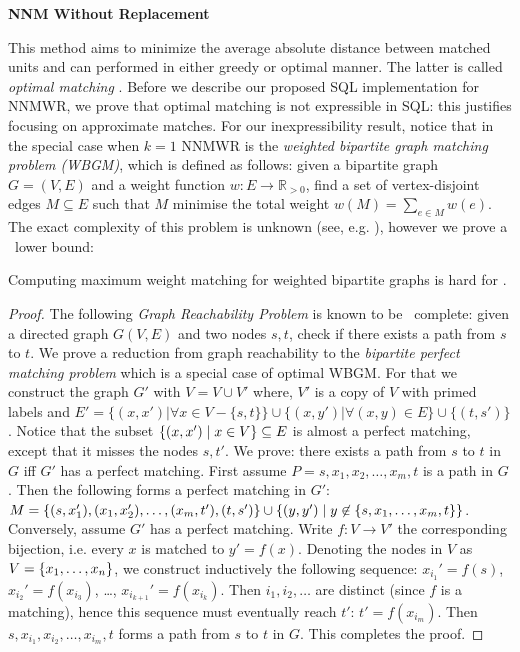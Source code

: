 {{\bf NNM Without Replacement}  This method aims
to minimize the average absolute distance between matched units and can performed in either greedy or optimal manner. The latter is called {\em optimal matching}
\cite{Rosenbaum93}. Before we describe our proposed SQL implementation for NNMWR, we prove
that optimal matching is not expressible in SQL: this justifies
focusing on approximate matches.  For our inexpressibility result,
notice that in the special case when $k=1$ NNMWR is the {\em weighted
  bipartite graph matching problem (WBGM)}, which is defined as
follows: given a bipartite graph $G=(V,E)$ and a weight function
$w: E \rightarrow \mathbb{R}_{>0}$, find a set of vertex-disjoint
edges $M \subseteq E$ such that $M$ minimise the total weight
$w(M) = \sum_{e \in M} w(e)$.  The exact complexity of this problem
is unknown (see, e.g. \cite{Avis83}), however we prove a \NLOGSPACE\
lower bound:

\vspace{-.2cm}
\begin{proposition} \label{pro:om}
Computing  maximum weight matching for  weighted bipartite graphs is hard for \NLOGSPACE.
\end{proposition}

\begin{proof} The following {\em Graph Reachability Problem} is known
  to be \NLOGSPACE\ complete: given a directed graph $G(V,E)$ and two
  nodes $s,t$, check if there exists a path from $s$ to $t$.  We prove
  a reduction from graph reachability to the {\em bipartite perfect
    matching problem} which is a special case of optimal WBGM. For
  that we construct the graph $G'$ with $V= V \cup V'$ where, $V'$ is
  a copy of $V$ with primed labels and
  $E'= \{(x,x')| \forall x \in V -\{s,t\} \} \cup \{(x,y')| \forall
  (x,y) \in E\} \cup \{(t,s')\}$.
  Notice that the subset $\{{(x,x')}\mid{x \in V}\} \subseteq E$ is
  almost a perfect matching, except that it misses the nodes $s, t'$.
  We prove: there exists a path from $s$ to $t$ in $G$ iff $G'$ has a
  perfect matching.  First assume $P=s, x_1, x_2, \ldots, x_m, t$ is a
  path in $G$. Then the following forms a perfect matching in $G'$:
  $M=\{(s,x_1'), (x_1,x_2'), \ldots, (x_{m},t'), (t,s')\} \cup
  \{{(y,y')}\mid{y \not\in \{s,x_1, \ldots, x_m,t\}}\}$.
  Conversely, assume $G'$ has a perfect matching. Write
  $f : V \rightarrow V'$ the corresponding bijection, i.e. every $x$
  is matched to $y'=f(x)$.  Denoting the nodes in $V$ as
  $V=\{x_1, \ldots, x_n\}$, we construct inductively the following
  sequence: $x_{i_1}' = f(s)$, $x_{i_2}' = f(x_{i_3})$, \ldots,
  $x_{i_{k+1}}' = f(x_{i_k})$.  Then $i_1, i_2, \ldots$ are distinct
  (since $f$ is a matching), hence this sequence must eventually reach
  $t'$: $t' = f(x_{i_m})$.  Then
  $s,x_{i_1},x_{i_2}, \ldots, x_{i_m}, t$ forms a path from $s$ to $t$
  in $G$.  This completes the proof.
\end{proof}

}

